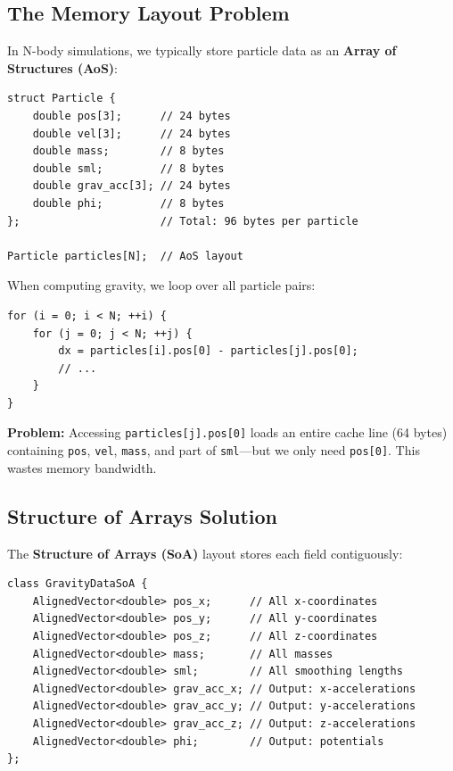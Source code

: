 \documentclass[12pt]{article}
\begin{document}
\subsection{The Memory Layout Problem}

In N-body simulations, we typically store particle data as an \textbf{Array of Structures (AoS)}:

\begin{verbatim}
struct Particle {
    double pos[3];      // 24 bytes
    double vel[3];      // 24 bytes
    double mass;        // 8 bytes
    double sml;         // 8 bytes
    double grav_acc[3]; // 24 bytes
    double phi;         // 8 bytes
};                      // Total: 96 bytes per particle

Particle particles[N];  // AoS layout
\end{verbatim}

When computing gravity, we loop over all particle pairs:
\begin{verbatim}
for (i = 0; i < N; ++i) {
    for (j = 0; j < N; ++j) {
        dx = particles[i].pos[0] - particles[j].pos[0];
        // ...
    }
}
\end{verbatim}

\textbf{Problem:} Accessing \texttt{particles[j].pos[0]} loads an entire cache line (64 bytes)
containing \texttt{pos}, \texttt{vel}, \texttt{mass}, and part of \texttt{sml}---but we only need
\texttt{pos[0]}. This wastes memory bandwidth.

\subsection{Structure of Arrays Solution}

The \textbf{Structure of Arrays (SoA)} layout stores each field contiguously:

\begin{verbatim}
class GravityDataSoA {
    AlignedVector<double> pos_x;      // All x-coordinates
    AlignedVector<double> pos_y;      // All y-coordinates
    AlignedVector<double> pos_z;      // All z-coordinates
    AlignedVector<double> mass;       // All masses
    AlignedVector<double> sml;        // All smoothing lengths
    AlignedVector<double> grav_acc_x; // Output: x-accelerations
    AlignedVector<double> grav_acc_y; // Output: y-accelerations
    AlignedVector<double> grav_acc_z; // Output: z-accelerations
    AlignedVector<double> phi;        // Output: potentials
};
\end{verbatim}
\end{document}
